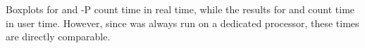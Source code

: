 \documentclass[11pt,landscape]{report}
\begin{document}
 
Boxplots for \colony{} and \colony{}-P count time in real time, while the results for \prt{} and \familyfinder{} count time in user time.  However, since \colony was always run on a dedicated processor, these times are directly comparable.
\newpage

\tableofcontents

\listoffigures



\end{document}
